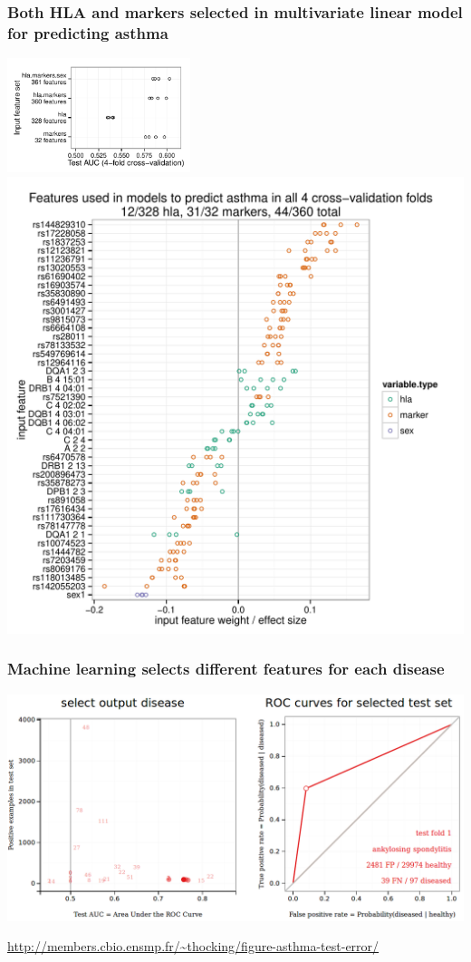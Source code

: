\documentclass{beamer}
\begin{document}
\begin{frame}
  \frametitle{Both HLA and markers selected in multivariate linear
    model for predicting asthma }

  \includegraphics[width=0.4\textwidth]{figure-asthma-old}
  \includegraphics[width=0.7\textheight]{figure-asthma-4folds}
  
\end{frame}

\begin{frame}
  \frametitle{Machine learning selects different features for each
    disease}
  \includegraphics[width=\textwidth]{screenshot-ankylosing-spondylitis}

  \url{http://members.cbio.ensmp.fr/~thocking/figure-asthma-test-error/}
\end{frame}
\end{document}
